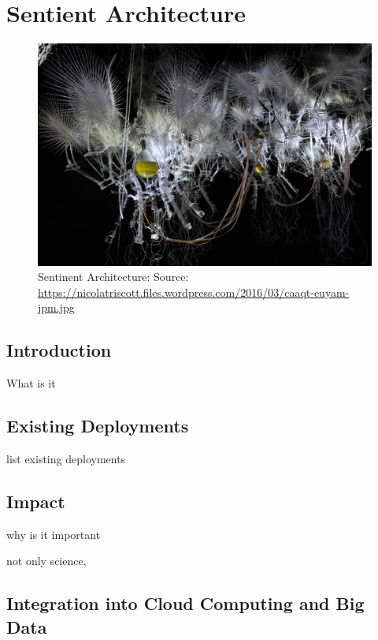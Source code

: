 

\chapter{Sentient Architecture}

\FILENAME

\begin{figure}
\centering
\includegraphics[width=\columnwidth]{images/sentient.jpeg}
\caption{Sentinent Architecture: Source: \url{https://nicolatriscott.files.wordpress.com/2016/03/caaqt-euyam-jpm.jpg}} 
\end{figure}

\section{Introduction}

What is it

\section{Existing Deployments}

list	existing deployments

\section{Impact}

why is it important

not only science, 

\section{Integration into Cloud Computing and Big Data}

